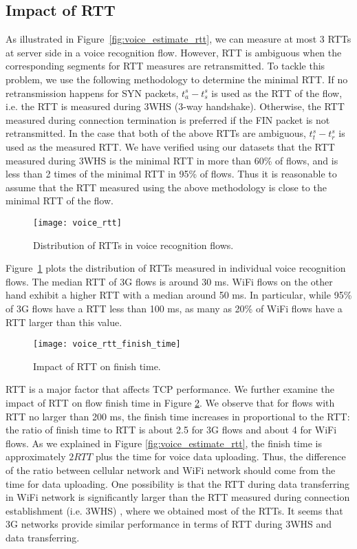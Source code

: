 \subsection{Impact of RTT}

As illustrated in Figure~\ref{fig:voice_estimate_rtt}, we can measure at most 3 RTTs at server side in a voice recognition flow. However, RTT is ambiguous when the corresponding segments for RTT measures are retransmitted. To tackle this problem, we use the following methodology to determine the minimal RTT. If no retransmission happens for SYN packets, $t^s_a - t^s_s$ is used as the RTT of the flow, i.e. the RTT is measured during 3WHS (3-way handshake). Otherwise, the RTT measured during connection termination is preferred if the FIN packet is not retransmitted. In the case that both of the above RTTs are ambiguous, $t^s_t - t^s_r$ is used as the measured RTT. We have verified using our datasets that the RTT measured during 3WHS is the minimal RTT in more than 60\% of flows, and is less than 2 times of the minimal RTT in 95\% of flows. Thus it is reasonable to assume that the RTT measured using the above methodology is close to the minimal RTT of the flow.

\begin{figure}[th]
\centering
	\texttt{[image: voice\_rtt]}
\caption{Distribution of RTTs in voice recognition flows.}
\label{fig:voice_rtt}
\end{figure}

Figure~\ref{fig:voice_rtt} plots the distribution of RTTs measured in individual voice recognition flows. The median RTT of 3G flows is around 30 ms. WiFi flows on the other hand exhibit a higher RTT with a median around 50 ms. In particular, while 95\% of 3G flows have a RTT less than 100 ms, as many as 20\% of WiFi flows have a RTT larger than this value. 

\begin{figure}[th]
\centering
	\texttt{[image: voice\_rtt\_finish\_time]}
\caption{Impact of RTT on finish time.}
\label{fig:v_rtt_time}
\end{figure}

RTT is a major factor that affects TCP performance. We further examine the impact of RTT on flow finish time in Figure \ref{fig:v_rtt_time}. We observe that for flows with RTT no larger than 200 ms, the finish time increases in proportional to the RTT: the ratio of finish time to RTT is about 2.5 for 3G flows and about 4 for WiFi flows. As we explained in Figure \ref{fig:voice_estimate_rtt}, the finish time is approximately $2RTT$ plus the time for voice data uploading. Thus, the difference of the ratio between cellular network and WiFi network should come from the time for data uploading. One possibility is that the RTT during data transferring in WiFi network is significantly larger than the RTT measured during connection establishment (i.e. 3WHS) \cite{UM-CS-2012-022}, where we obtained most of the RTTs. It seems that 3G networks provide similar performance in terms of RTT during 3WHS and data transferring. 

